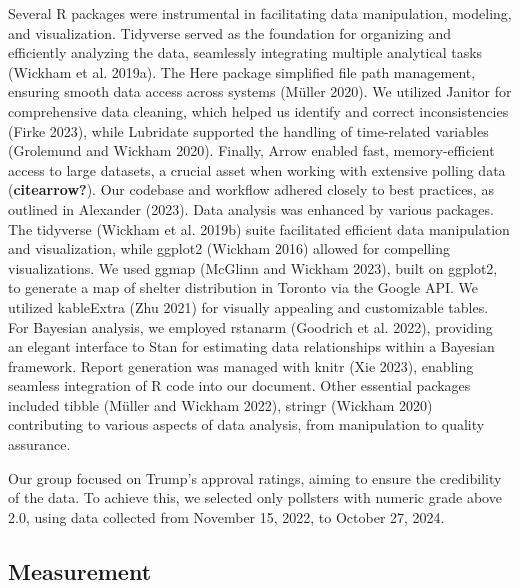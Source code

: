 \documentclass[
  letterpaper,
  DIV=11,
  numbers=noendperiod]{scrartcl}
\begin{document}
Several R packages were instrumental in facilitating data manipulation,
modeling, and visualization. Tidyverse served as the foundation for
organizing and efficiently analyzing the data, seamlessly integrating
multiple analytical tasks (Wickham et al. 2019a). The Here package
simplified file path management, ensuring smooth data access across
systems (Müller 2020). We utilized Janitor for comprehensive data
cleaning, which helped us identify and correct inconsistencies (Firke
2023), while Lubridate supported the handling of time-related variables
(Grolemund and Wickham 2020). Finally, Arrow enabled fast,
memory-efficient access to large datasets, a crucial asset when working
with extensive polling data (\textbf{citearrow?}). Our codebase and
workflow adhered closely to best practices, as outlined in Alexander
(2023). Data analysis was enhanced by various packages. The tidyverse
(Wickham et al. 2019b) suite facilitated efficient data manipulation and
visualization, while ggplot2 (Wickham 2016) allowed for compelling
visualizations. We used ggmap (McGlinn and Wickham 2023), built on
ggplot2, to generate a map of shelter distribution in Toronto via the
Google API. We utilized kableExtra (Zhu 2021) for visually appealing and
customizable tables. For Bayesian analysis, we employed rstanarm
(Goodrich et al. 2022), providing an elegant interface to Stan for
estimating data relationships within a Bayesian framework. Report
generation was managed with knitr (Xie 2023), enabling seamless
integration of R code into our document. Other essential packages
included tibble (Müller and Wickham 2022), stringr (Wickham 2020)
contributing to various aspects of data analysis, from manipulation to
quality assurance.

Our group focused on Trump's approval ratings, aiming to ensure the
credibility of the data. To achieve this, we selected only pollsters
with numeric grade above 2.0, using data collected from November 15,
2022, to October 27, 2024.

\hypertarget{measurement}{%
\subsection{Measurement}\label{measurement}}
\end{document}

